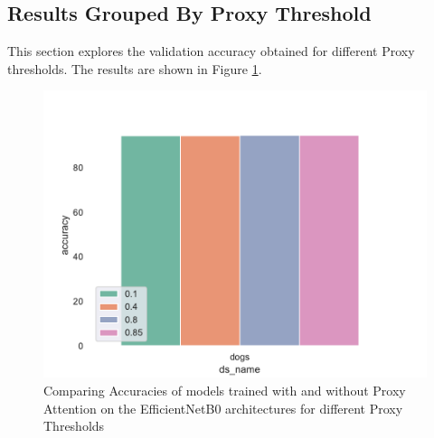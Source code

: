 \subsection{Results Grouped By Proxy Threshold}
This section explores the validation accuracy obtained for different Proxy thresholds. The results are shown in Figure \ref{fig:proxy_threshold}. 
\begin{figure}[H]
    \centering
    \includegraphics[width=1\textwidth]{results/proxy_threshold_results.pdf}
    \caption{Comparing Accuracies of models trained with and without Proxy Attention on the EfficientNetB0 \cite{tanEfficientnetRethinkingModel2019} architectures for different Proxy Thresholds}
    \label{fig:proxy_threshold}
\end{figure}

